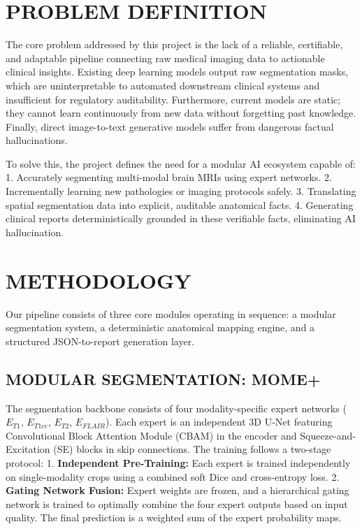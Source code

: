 \documentclass[12pt, a4paper]{report}
\begin{document}
\chapter{PROBLEM DEFINITION}
The core problem addressed by this project is the lack of a reliable, certifiable, and adaptable pipeline connecting raw medical imaging data to actionable clinical insights. Existing deep learning models output raw segmentation masks, which are uninterpretable to automated downstream clinical systems and insufficient for regulatory auditability. Furthermore, current models are static; they cannot learn continuously from new data without forgetting past knowledge. Finally, direct image-to-text generative models suffer from dangerous factual hallucinations. 

To solve this, the project defines the need for a modular AI ecosystem capable of:
1. Accurately segmenting multi-modal brain MRIs using expert networks.
2. Incrementally learning new pathologies or imaging protocols safely.
3. Translating spatial segmentation data into explicit, auditable anatomical facts.
4. Generating clinical reports deterministically grounded in these verifiable facts, eliminating AI hallucination.

\chapter{METHODOLOGY}
Our pipeline consists of three core modules operating in sequence: a modular segmentation system, a deterministic anatomical mapping engine, and a structured JSON-to-report generation layer.

\section{MODULAR SEGMENTATION: MOME+}
The segmentation backbone consists of four modality-specific expert networks ($E_{T1}$, $E_{T1ce}$, $E_{T2}$, $E_{FLAIR}$). Each expert is an independent 3D U-Net featuring Convolutional Block Attention Module (CBAM) in the encoder and Squeeze-and-Excitation (SE) blocks in skip connections. The training follows a two-stage protocol:
1. \textbf{Independent Pre-Training:} Each expert is trained independently on single-modality crops using a combined soft Dice and cross-entropy loss.
2. \textbf{Gating Network Fusion:} Expert weights are frozen, and a hierarchical gating network is trained to optimally combine the four expert outputs based on input quality. The final prediction is a weighted sum of the expert probability maps.
\end{document}
